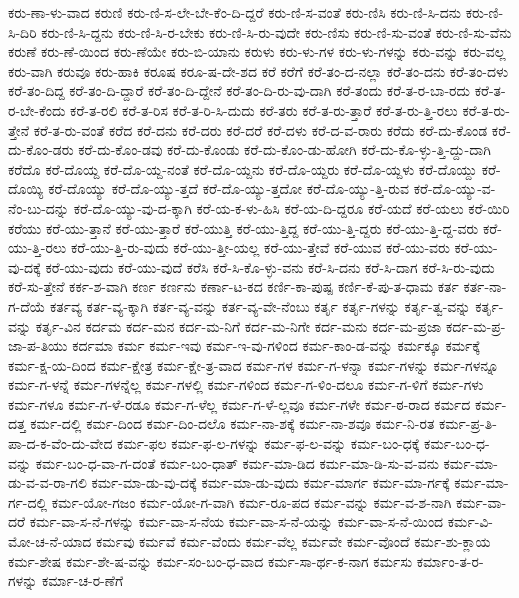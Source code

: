 {ಕರು-ಣಾ-ಳು-ವಾದ
ಕರುಣಿ
ಕರು-ಣಿ-ಸ-ಲೇ-ಬೇ-ಕೆಂ-ದಿ-ದ್ದರೆ
ಕರು-ಣಿ-ಸ-ವಂತೆ
ಕರು-ಣಿಸಿ
ಕರು-ಣಿ-ಸಿ-ದನು
ಕರು-ಣಿ-ಸಿ-ದಿರಿ
ಕರು-ಣಿ-ಸಿ-ದ್ದನು
ಕರು-ಣಿ-ಸಿ-ರ-ಬೇಕು
ಕರು-ಣಿ-ಸಿ-ರು-ವುದೇ
ಕರು-ಣಿಸು
ಕರು-ಣಿ-ಸು-ವಂತೆ
ಕರು-ಣಿ-ಸು-ವೆನು
ಕರುಣೆ
ಕರು-ಣೆ-ಯಿಂದ
ಕರು-ಣೆಯೇ
ಕರು-ಬಿ-ಯಾನು
ಕರುಳು
ಕರು-ಳು-ಗಳ
ಕರು-ಳು-ಗಳನ್ನು
ಕರು-ವನ್ನು
ಕರು-ವಲ್ಲ
ಕರು-ವಾಗಿ
ಕರುವೂ
ಕರು-ಹಾಕಿ
ಕರೂಷ
ಕರೂ-ಷ-ದೇ-ಶದ
ಕರೆ
ಕರೆಗೆ
ಕರೆ-ತಂ-ದ-ನಲ್ಲಾ
ಕರೆ-ತಂ-ದನು
ಕರೆ-ತಂ-ದಳು
ಕರೆ-ತಂ-ದಿದ್ದ
ಕರೆ-ತಂ-ದಿ-ದ್ದಾರೆ
ಕರೆ-ತಂ-ದಿ-ದ್ದೇನೆ
ಕರೆ-ತಂ-ದಿ-ರು-ವು-ದಾಗಿ
ಕರೆ-ತಂದು
ಕರೆ-ತ-ರ-ಬಾ-ರದು
ಕರೆ-ತ-ರ-ಬೇ-ಕೆಂದು
ಕರೆ-ತ-ರಲಿ
ಕರೆ-ತ-ರಿಸ
ಕರೆ-ತ-ರಿ-ಸಿ-ದುದು
ಕರೆ-ತರು
ಕರೆ-ತ-ರು-ತ್ತಾರೆ
ಕರೆ-ತ-ರು-ತ್ತಿ-ರಲು
ಕರೆ-ತ-ರು-ತ್ತೇನೆ
ಕರೆ-ತ-ರು-ವಂತೆ
ಕರೆದ
ಕರೆ-ದನು
ಕರೆ-ದರು
ಕರೆ-ದರೆ
ಕರೆ-ದಳು
ಕರೆ-ದ-ವ-ರಾರು
ಕರೆದು
ಕರೆ-ದು-ಕೊಂಡ
ಕರೆ-ದು-ಕೊಂ-ಡರು
ಕರೆ-ದು-ಕೊಂ-ಡವು
ಕರೆ-ದು-ಕೊಂಡು
ಕರೆ-ದು-ಕೊಂ-ಡು-ಹೋಗಿ
ಕರೆ-ದು-ಕೊ-ಳ್ಳು-ತ್ತಿ-ದ್ದು-ದಾಗಿ
ಕರೆದೊ
ಕರೆ-ದೊಯ್ದ
ಕರೆ-ದೊ-ಯ್ದ-ನಂತೆ
ಕರೆ-ದೊ-ಯ್ದನು
ಕರೆ-ದೊ-ಯ್ದರು
ಕರೆ-ದೊ-ಯ್ದಳು
ಕರೆ-ದೊಯ್ದು
ಕರೆ-ದೊಯ್ಯಿ
ಕರೆ-ದೊಯ್ಯು
ಕರೆ-ದೊ-ಯ್ಯು-ತ್ತದೆ
ಕರೆ-ದೊ-ಯ್ಯು-ತ್ತದೋ
ಕರೆ-ದೊ-ಯ್ಯು-ತ್ತಿ-ರುವ
ಕರೆ-ದೊ-ಯ್ಯು-ವ-ನೆಂ-ಬು-ದನ್ನು
ಕರೆ-ದೊ-ಯ್ಯು-ವು-ದ-ಕ್ಕಾಗಿ
ಕರೆ-ಯ-ಕ-ಳು-ಹಿಸಿ
ಕರೆ-ಯ-ದಿ-ದ್ದರೂ
ಕರೆ-ಯದೆ
ಕರೆ-ಯಲು
ಕರೆ-ಯಿರಿ
ಕರೆಯು
ಕರೆ-ಯು-ತ್ತಾನೆ
ಕರೆ-ಯು-ತ್ತಾರೆ
ಕರೆ-ಯುತ್ತಿ
ಕರೆ-ಯು-ತ್ತಿದ್ದ
ಕರೆ-ಯು-ತ್ತಿ-ದ್ದರು
ಕರೆ-ಯು-ತ್ತಿ-ದ್ದ-ವರು
ಕರೆ-ಯು-ತ್ತಿ-ರಲು
ಕರೆ-ಯು-ತ್ತಿ-ರು-ವುದು
ಕರೆ-ಯು-ತ್ತೀ-ಯಲ್ಲ
ಕರೆ-ಯು-ತ್ತೇವೆ
ಕರೆ-ಯುವ
ಕರೆ-ಯು-ವರು
ಕರೆ-ಯು-ವು-ದಕ್ಕೆ
ಕರೆ-ಯು-ವುದು
ಕರೆ-ಯು-ವುದೆ
ಕರೆಸಿ
ಕರೆ-ಸಿ-ಕೊ-ಳ್ಳು-ವನು
ಕರೆ-ಸಿ-ದನು
ಕರೆ-ಸಿ-ದಾಗ
ಕರೆ-ಸಿ-ರು-ವುದು
ಕರೆ-ಸು-ತ್ತೇನೆ
ಕರ್ಕ-ಶ-ವಾಗಿ
ಕರ್ಣ
ಕರ್ಣನು
ಕರ್ಣಾ-ಟ-ಕದ
ಕರ್ಣಿ-ಕಾ-ಪುಷ್ಪ
ಕರ್ಣಿ-ಕೆ-ಪು-ತ-ಧಾಮ
ಕರ್ತ
ಕರ್ತ-ನಾ-ಗ-ದೆಯೆ
ಕರ್ತವ್ಯ
ಕರ್ತ-ವ್ಯ-ಕ್ಕಾಗಿ
ಕರ್ತ-ವ್ಯ-ವನ್ನು
ಕರ್ತ-ವ್ಯ-ವೇ-ನೆಂಬು
ಕರ್ತೃ
ಕರ್ತೃ-ಗಳನ್ನು
ಕರ್ತೃ-ತ್ವ-ವನ್ನು
ಕರ್ತೃ-ವನ್ನು
ಕರ್ತೃ-ವಿನ
ಕರ್ದಮ
ಕರ್ದ-ಮನ
ಕರ್ದ-ಮ-ನಿಗೆ
ಕರ್ದ-ಮ-ನಿಗೇ
ಕರ್ದ-ಮನು
ಕರ್ದ-ಮ-ಪ್ರಜಾ
ಕರ್ದ-ಮ-ಪ್ರ-ಜಾ-ಪ-ತಿಯು
ಕರ್ದಮಾ
ಕರ್ಮ
ಕರ್ಮ-ಇವು
ಕರ್ಮ-ಇ-ವು-ಗಳಿಂದ
ಕರ್ಮ-ಕಾಂ-ಡ-ವನ್ನು
ಕರ್ಮಕ್ಕೂ
ಕರ್ಮಕ್ಕೆ
ಕರ್ಮ-ಕ್ಷ-ಯ-ದಿಂದ
ಕರ್ಮ-ಕ್ಷೇತ್ರ
ಕರ್ಮ-ಕ್ಷೇ-ತ್ರ-ವಾದ
ಕರ್ಮ-ಗಳ
ಕರ್ಮ-ಗ-ಳನ್ನಾ
ಕರ್ಮ-ಗಳನ್ನು
ಕರ್ಮ-ಗಳನ್ನೂ
ಕರ್ಮ-ಗ-ಳನ್ನೆ
ಕರ್ಮ-ಗಳನ್ನೆಲ್ಲ
ಕರ್ಮ-ಗಳಲ್ಲಿ
ಕರ್ಮ-ಗಳಿಂದ
ಕರ್ಮ-ಗ-ಳಿಂ-ದಲೂ
ಕರ್ಮ-ಗ-ಳಿಗೆ
ಕರ್ಮ-ಗಳು
ಕರ್ಮ-ಗಳೂ
ಕರ್ಮ-ಗ-ಳೆ-ರಡೂ
ಕರ್ಮ-ಗ-ಳೆಲ್ಲ
ಕರ್ಮ-ಗ-ಳೆ-ಲ್ಲವೂ
ಕರ್ಮ-ಗಳೇ
ಕರ್ಮ-ಠ-ರಾದ
ಕರ್ಮದ
ಕರ್ಮ-ದತ್ತ
ಕರ್ಮ-ದಲ್ಲಿ
ಕರ್ಮ-ದಿಂದ
ಕರ್ಮ-ದಿಂ-ದಲೊ
ಕರ್ಮ-ನಾ-ಶಕ್ಕೆ
ಕರ್ಮ-ನಾ-ಶವೂ
ಕರ್ಮ-ನಿ-ರತ
ಕರ್ಮ-ಪ್ರ-ತಿ-ಪಾ-ದ-ಕ-ವೆಂ-ದು-ವೇದ
ಕರ್ಮ-ಫಲ
ಕರ್ಮ-ಫ-ಲ-ಗಳನ್ನು
ಕರ್ಮ-ಫ-ಲ-ವನ್ನು
ಕರ್ಮ-ಬಂ-ಧಕ್ಕೆ
ಕರ್ಮ-ಬಂ-ಧ-ವನ್ನು
ಕರ್ಮ-ಬಂ-ಧ-ವಾ-ಗ-ದಂತೆ
ಕರ್ಮ-ಬಂ-ಧಾತ್
ಕರ್ಮ-ಮಾ-ಡಿದ
ಕರ್ಮ-ಮಾ-ಡಿ-ಸು-ವ-ವನು
ಕರ್ಮ-ಮಾ-ಡು-ವ-ವ-ರಾ-ಗಲಿ
ಕರ್ಮ-ಮಾ-ಡು-ವು-ದಕ್ಕೆ
ಕರ್ಮ-ಮಾ-ಡು-ವುದು
ಕರ್ಮ-ಮಾರ್ಗ
ಕರ್ಮ-ಮಾ-ರ್ಗಕ್ಕೆ
ಕರ್ಮ-ಮಾ-ರ್ಗ-ದಲ್ಲಿ
ಕರ್ಮ-ಯೋ-ಗಜಂ
ಕರ್ಮ-ಯೋ-ಗ-ವಾಗಿ
ಕರ್ಮ-ರೂ-ಪದ
ಕರ್ಮ-ವನ್ನು
ಕರ್ಮ-ವ-ಶ-ನಾಗಿ
ಕರ್ಮ-ವಾ-ದರೆ
ಕರ್ಮ-ವಾ-ಸ-ನೆ-ಗಳನ್ನು
ಕರ್ಮ-ವಾ-ಸ-ನೆಯ
ಕರ್ಮ-ವಾ-ಸ-ನೆ-ಯನ್ನು
ಕರ್ಮ-ವಾ-ಸ-ನೆ-ಯಿಂದ
ಕರ್ಮ-ವಿ-ಮೋ-ಚ-ನೆ-ಯಾದ
ಕರ್ಮವು
ಕರ್ಮವೆ
ಕರ್ಮ-ವೆಂದು
ಕರ್ಮ-ವೆಲ್ಲ
ಕರ್ಮವೇ
ಕರ್ಮ-ವೊಂದೆ
ಕರ್ಮ-ಶು-ಕ್ಲಾಯ
ಕರ್ಮ-ಶೇಷ
ಕರ್ಮ-ಶೇ-ಷ-ವನ್ನು
ಕರ್ಮ-ಸಂ-ಬಂ-ಧ-ವಾದ
ಕರ್ಮ-ಸಾ-ರ್ಥ-ಕ-ನಾಗ
ಕರ್ಮಸು
ಕರ್ಮಾಂ-ತ-ರ-ಗಳನ್ನು
ಕರ್ಮಾ-ಚ-ರ-ಣೆಗೆ
}
